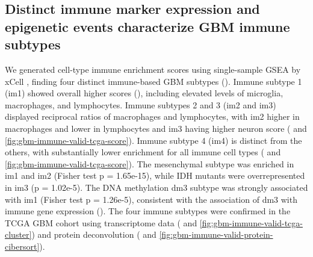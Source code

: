 \subsection{Distinct immune marker expression and epigenetic events characterize GBM immune subtypes}
We generated cell-type immune enrichment scores using single-sample GSEA by xCell \cite{arand_butteaj:XCellDigitally2017}, finding four distinct immune-based GBM subtypes (). Immune subtype 1 (im1) showed overall higher scores (), including elevated levels of microglia, macrophages, and lymphocytes. Immune subtypes 2 and 3 (im2 and im3) displayed reciprocal ratios of macrophages and lymphocytes, with im2 higher in macrophages and lower in lymphocytes and im3 having higher neuron score ( and \ref{fig:gbm-immune-valid-tcga-score}). Immune subtype 4 (im4) is distinct from the others, with substantially lower enrichment for all immune cell types ( and \ref{fig:gbm-immune-valid-tcga-score}). The mesenchymal subtype was enriched in im1 and im2 (Fisher test p = 1.65e-15), while IDH mutants were overrepresented in im3 (p = 1.02e-5). The DNA methylation dm3 subtype was strongly associated with im1 (Fisher test p = 1.26e-5), consistent with the association of dm3 with immune gene expression (). The four immune subtypes were confirmed in the TCGA GBM cohort using transcriptome data ( and \ref{fig:gbm-immune-valid-tcga-cluster}) and protein deconvolution ( and \ref{fig:gbm-immune-valid-protein-cibersort}).

